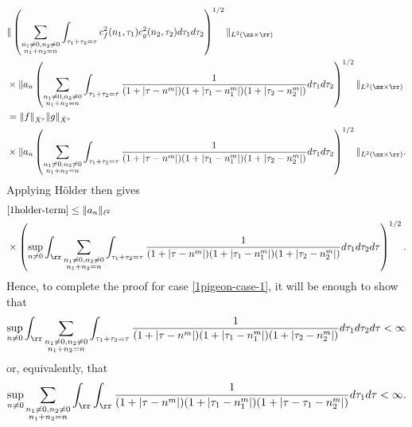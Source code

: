 %
%
\begin{align}
	\notag
		& \|\left( \sum_{\substack{n_1 \neq 0, n_2 \neq 0 \\n_1 +n_2 =n}}\int_{\tau_1 + \tau_2 = \tau} c_{f}^{2}(n_1, \tau_1)
		c_{g}^{2} (n_2, \tau_2) d \tau_1 d \tau_2 \right)^{1/2} \|_{L^{2}(\zz \times
		\rr)}
		\\
		\notag
		& \times  \|a_{n}
		\left( \sum_{\substack{n_1 \neq 0, n_2 \neq 0 \\n_1 +n_2
		=n}}\int_{\tau_1 + \tau_2 = \tau} \frac{1}{ (1 + | \tau - n^m |)(1 + |
		\tau_{1}-n_{1}^m |)(1 + | \tau_2 -n_{2}^m |)} d \tau_1 d \tau_2
		\right)^{1/2} \|_{L^2(\zz \times \rr)}
		\\
		\notag
		& = \|f\|_{\dot{X}^s} \|g\|_{\dot{X}^s}
		\\
		\label{1holder-term}
		& \times 
		\|a_{n}
		\left( \sum_{\substack{n_1 \neq 0, n_2 \neq 0 \\n_1 +n_2
		=n}}\int_{\tau_1 + \tau_2 = \tau} \frac{1}{ (1 + | \tau - n^m |)(1 + |
		\tau_{1}-n_{1}^m |)(1 + | \tau_2 -n_{2}^m |)} d \tau_1 d \tau_2
		\right)^{1/2} \|_{L^2(\zz \times \rr)}.
\end{align}
%
Applying H{\"o}lder then gives
%
%
\begin{equation*}
	\begin{split}
		& \eqref{1holder-term}
		 \le \| a_{n} \|_{\ell^2}
		\\
		& \times \left( \sup_{n \neq 0} \int_{\rr}
		\sum_{\substack{n_1 \neq 0, n_2 \neq 0 \\n_1 +n_2 =n}} \int_{\tau_1 + \tau_2
		= \tau} \frac{1}{ (1 + | \tau - n^m |)(1 + |
		\tau_{1}-n_{1}^m |)(1 + | \tau_2 -n_{2}^m |)} d \tau_1 d \tau_2 d \tau
		\right)^{1/2}.
	\end{split}
\end{equation*}
%
%
Hence, to complete the proof for case \eqref{1pigeon-case-1}, it will be enough
to show that 
%
%
%
%
\begin{equation*}
	\begin{split}
		 \sup_{n \neq 0} \int_{\rr}
		\sum_{\substack{n_1 \neq 0, n_2 \neq 0 \\n_1 +n_2 =n}} \int_{\tau_1 + \tau_2
		= \tau} \frac{1}{ (1 + | \tau - n^m |)(1 + |
		\tau_{1}-n_{1}^m |)(1 + | \tau_2 -n_{2}^m |)} d \tau_1 d \tau_2 d \tau <\infty
	\end{split}
\end{equation*}
%
%
or, equivalently, that
%
%
\begin{equation}
	\label{112g}
	\begin{split}
		\sup_{n \neq 0} \sum_{\substack{n_1 \neq 0, n_2 \neq 0 \\n_1 +n_2 =n}} \int_{\rr}
		\int_\rr  \frac{1}{(1 + | \tau - n^m |)(1 + | \tau_1 - n_{1}^m |)(1 + | \tau - \tau_1 -
		n_2^m |)} d \tau_1 d \tau < \infty.
	\end{split}
\end{equation}
